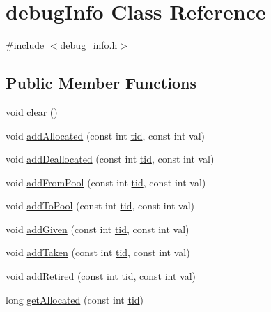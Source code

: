 \hypertarget{classdebugInfo}{}\section{debug\+Info Class Reference}
\label{classdebugInfo}


{\ttfamily \#include $<$debug\+\_\+info.\+h$>$}

\subsection*{Public Member Functions}
\begin{DoxyCompactItemize}
\item 
void \hyperlink{classdebugInfo_a8ad22e4525f19624b99499022d2d97bc}{clear} ()
\item 
void \hyperlink{classdebugInfo_a800dfa89a28bf30d1bb19d7489282fed}{add\+Allocated} (const int \hyperlink{microbench_2main_8cpp_a9ca9869868fe7e7a38a921cc7de4103f}{tid}, const int val)
\item 
void \hyperlink{classdebugInfo_ab7d4ff34c583547b23b28a2265d443a6}{add\+Deallocated} (const int \hyperlink{microbench_2main_8cpp_a9ca9869868fe7e7a38a921cc7de4103f}{tid}, const int val)
\item 
void \hyperlink{classdebugInfo_ab197f2e453185fed7859a73c79922453}{add\+From\+Pool} (const int \hyperlink{microbench_2main_8cpp_a9ca9869868fe7e7a38a921cc7de4103f}{tid}, const int val)
\item 
void \hyperlink{classdebugInfo_a3536c9bcae7dc8713f0f96c5f7249933}{add\+To\+Pool} (const int \hyperlink{microbench_2main_8cpp_a9ca9869868fe7e7a38a921cc7de4103f}{tid}, const int val)
\item 
void \hyperlink{classdebugInfo_a723b7069dad22dd770a0c838973fb720}{add\+Given} (const int \hyperlink{microbench_2main_8cpp_a9ca9869868fe7e7a38a921cc7de4103f}{tid}, const int val)
\item 
void \hyperlink{classdebugInfo_a78df57a1e985926a359d16c52e450be5}{add\+Taken} (const int \hyperlink{microbench_2main_8cpp_a9ca9869868fe7e7a38a921cc7de4103f}{tid}, const int val)
\item 
void \hyperlink{classdebugInfo_a6cb34e0e4af05ab1e306bfb54bce1985}{add\+Retired} (const int \hyperlink{microbench_2main_8cpp_a9ca9869868fe7e7a38a921cc7de4103f}{tid}, const int val)
\item 
long \hyperlink{classdebugInfo_a52b665497c6b515a7d7dab228f5a7395}{get\+Allocated} (const int \hyperlink{microbench_2main_8cpp_a9ca9869868fe7e7a38a921cc7de4103f}{tid})

\end{DoxyCompactItemize}
